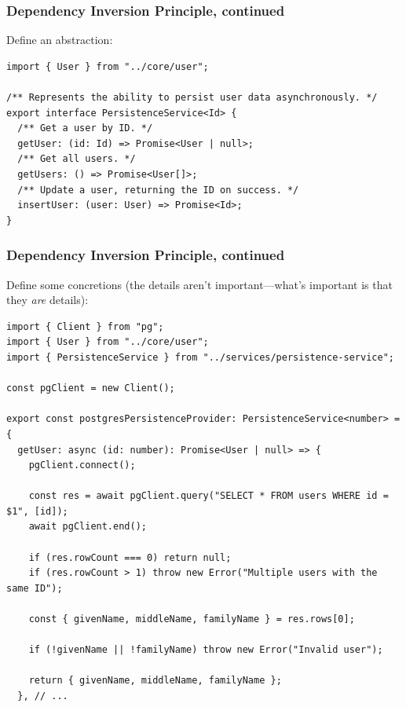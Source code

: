 \documentclass[aspectratio=169]{beamer}
\begin{document}
\begin{frame}[fragile]
  \frametitle{Dependency Inversion Principle, continued}
  Define an abstraction:

  \vspace{1em}

  \begin{verbatim}
import { User } from "../core/user";

/** Represents the ability to persist user data asynchronously. */
export interface PersistenceService<Id> {
  /** Get a user by ID. */
  getUser: (id: Id) => Promise<User | null>;
  /** Get all users. */
  getUsers: () => Promise<User[]>;
  /** Update a user, returning the ID on success. */
  insertUser: (user: User) => Promise<Id>;
}
\end{verbatim}
\end{frame}

\begin{frame}[fragile]
  \frametitle{Dependency Inversion Principle, continued}
  Define some concretions (the details aren't important---what's important is
  that they \emph{are} details):

  \vspace{1em}

  \begin{verbatim}
import { Client } from "pg";
import { User } from "../core/user";
import { PersistenceService } from "../services/persistence-service";

const pgClient = new Client();

export const postgresPersistenceProvider: PersistenceService<number> = {
  getUser: async (id: number): Promise<User | null> => {
    pgClient.connect();

    const res = await pgClient.query("SELECT * FROM users WHERE id = $1", [id]);
    await pgClient.end();

    if (res.rowCount === 0) return null;
    if (res.rowCount > 1) throw new Error("Multiple users with the same ID");

    const { givenName, middleName, familyName } = res.rows[0];

    if (!givenName || !familyName) throw new Error("Invalid user");

    return { givenName, middleName, familyName };
  }, // ...
  \end{verbatim}
\end{frame}
\end{document}
